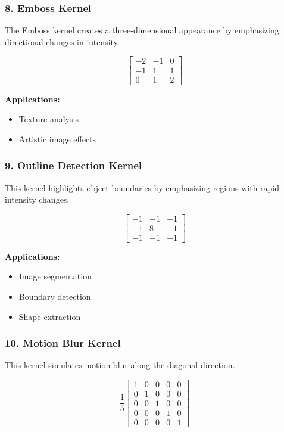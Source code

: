 \documentclass[11pt]{article}
\begin{document}
\subsubsection*{8. Emboss Kernel}

The Emboss kernel creates a three-dimensional appearance by emphasizing directional changes in intensity.

\[
\begin{bmatrix}
-2 & -1 & 0\\
-1 & 1 & 1\\
0 & 1 & 2
\end{bmatrix}
\]

\textbf{Applications:}
\begin{itemize}
\item Texture analysis
\item Artistic image effects
\end{itemize}

\subsubsection*{9. Outline Detection Kernel}

This kernel highlights object boundaries by emphasizing regions with rapid intensity changes.

\[
\begin{bmatrix}
-1 & -1 & -1\\
-1 & 8 & -1\\
-1 & -1 & -1
\end{bmatrix}
\]

\textbf{Applications:}
\begin{itemize}
\item Image segmentation
\item Boundary detection
\item Shape extraction
\end{itemize}

\subsubsection*{10. Motion Blur Kernel}

This kernel simulates motion blur along the diagonal direction.

\[
\frac{1}{5}
\begin{bmatrix}
1 & 0 & 0 & 0 & 0\\
0 & 1 & 0 & 0 & 0\\
0 & 0 & 1 & 0 & 0\\
0 & 0 & 0 & 1 & 0\\
0 & 0 & 0 & 0 & 1
\end{bmatrix}
\]
\end{document}
